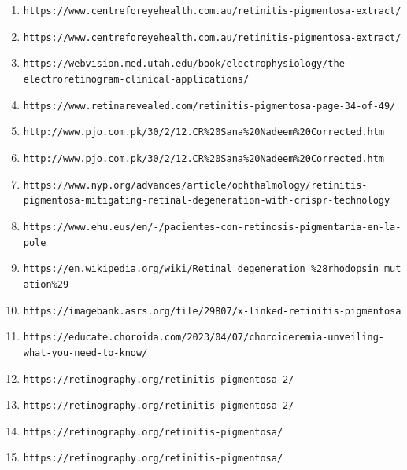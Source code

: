 \documentclass{article}
\begin{document}
\begin{enumerate}
		\item \nolinkurl{https://www.centreforeyehealth.com.au/retinitis-pigmentosa-extract/}
		
		\item \nolinkurl{https://www.centreforeyehealth.com.au/retinitis-pigmentosa-extract/}
		
		\item \nolinkurl{https://webvision.med.utah.edu/book/electrophysiology/the-electroretinogram-clinical-applications/}
		
		\item \nolinkurl{https://www.retinarevealed.com/retinitis-pigmentosa-page-34-of-49/}
		
		\item \nolinkurl{http://www.pjo.com.pk/30/2/12.CR%20Sana%20Nadeem%20Corrected.htm}
		
		\item \nolinkurl{http://www.pjo.com.pk/30/2/12.CR%20Sana%20Nadeem%20Corrected.htm}
		
		\item \nolinkurl{https://www.nyp.org/advances/article/ophthalmology/retinitis-pigmentosa-mitigating-retinal-degeneration-with-crispr-technology}
		
		\item \nolinkurl{https://www.ehu.eus/en/-/pacientes-con-retinosis-pigmentaria-en-la-pole}
		
		\item \nolinkurl{https://en.wikipedia.org/wiki/Retinal_degeneration_%28rhodopsin_mutation%29}
		
		\item \nolinkurl{https://imagebank.asrs.org/file/29807/x-linked-retinitis-pigmentosa}
		
		\item \nolinkurl{https://educate.choroida.com/2023/04/07/choroideremia-unveiling-what-you-need-to-know/}
		
		\item \nolinkurl{https://retinography.org/retinitis-pigmentosa-2/}
		
		\item \nolinkurl{https://retinography.org/retinitis-pigmentosa-2/}
		
		\item \nolinkurl{https://retinography.org/retinitis-pigmentosa/}
		
		\item \nolinkurl{https://retinography.org/retinitis-pigmentosa/}
	\end{enumerate}
		
\end{document}
